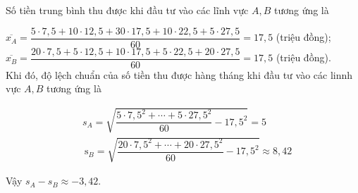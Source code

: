 \begin{bt}
{		Số tiền trung bình thu được khi đầu tư vào các lĩnh vực $A, B$ tương ứng là
		
		$\overline{x_A}=\dfrac{5\cdot 7{,}5+10\cdot 12{,}5+30\cdot 17{,}5+10\cdot 22{,}5+5\cdot 27{,}5}{60}=17{,}5$ (triệu đồng);\\
		
		$\overline{x_B}=\dfrac{20\cdot 7{,}5+5\cdot 12{,}5+10\cdot 17{,}5+5\cdot 22{,}5+20\cdot 27{,}5}{60}=17{,}5$ (triệu đồng).\\
		
		Khi đó, độ lệch chuẩn của số tiền thu được hàng tháng khi đầu tư vào các linnh vực $A, B$ tương ứng là
		
		$$
		\begin{aligned}
		& s_A=\sqrt{\dfrac{5\cdot 7{,}5^2+\cdots+5\cdot 27{,}5^2}{60}-17{,}5^2}=5 \\
		& \mathrm{~s}_B=\sqrt{\dfrac{20\cdot 7{,}5^2+\cdots+20\cdot 27{,}5^2}{60}-17{,}5^2} \approx 8{,}42
		\end{aligned}
		$$
		
		Vậy $s_A-s_B \approx-3{,}42$.
	}
\end{bt}


